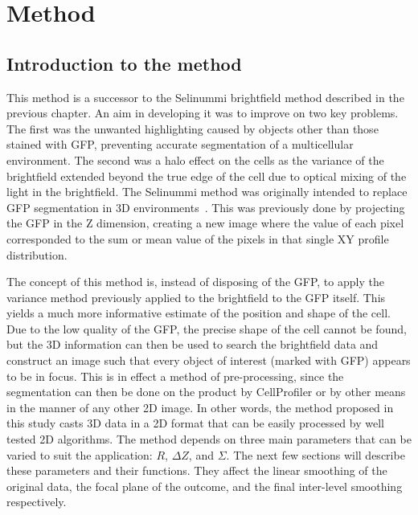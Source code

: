 
\chapter{Method}

\ifpdf
    \graphicspath{{Chapter4/Figs/Raster/}{Chapter4/Figs/PDF/}{Chapter4/Figs/}}
\else
    \graphicspath{{Chapter4/Figs/Vector/}{Chapter4/Figs/}}
\fi

\section{Introduction to the method}

This method is a successor to the Selinummi brightfield method described in the previous chapter. An aim in developing it was to improve on two key problems. The first was the unwanted highlighting caused by objects other than those stained with GFP, preventing accurate segmentation of a multicellular environment. The second was a halo effect on the cells as the variance of the brightfield extended beyond the true edge of the cell due to optical mixing of the light in the brightfield. The Selinummi method was originally intended to replace GFP segmentation in 3D environments~\cite{Selinummi:09}. This was previously done by projecting the GFP in the Z dimension, creating a new image where the value of each pixel corresponded to the sum or mean value of the pixels in that single XY profile distribution.

The concept of this method is, instead of disposing of the GFP, to apply the variance method previously applied to the brightfield to the GFP itself. This yields a much more informative estimate of the position and shape of the cell. Due to the low quality of the GFP, the precise shape of the cell cannot be found, but the 3D information can then be used to search the brightfield data and construct an image such that every object of interest (marked with GFP) appears to be in focus. This is in effect a method of pre-processing, since the segmentation can then be done on the product by CellProfiler or by other means in the manner of any other 2D image. In other words, the method proposed in this study casts 3D data in a 2D format that can be easily processed by well tested 2D algorithms. The method depends on three main parameters that can be varied to suit the application: $R$, $\Delta Z$, and $\Sigma$. The next few sections will describe these parameters and their functions. They affect the linear smoothing of the original data, the focal plane of the outcome, and the final inter-level smoothing respectively.

